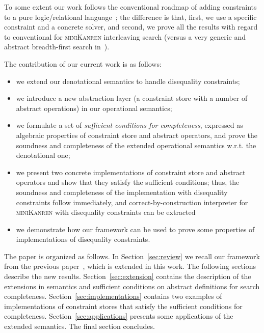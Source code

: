 To some extent our work follows the conventional roadmap of adding constraints to a pure logic/relational language~\cite{CLP}; the difference is that, first,
we use a specific constraint and a concrete solver, and second, we prove all the results with regard to conventional for \textsc{miniKanren} interleaving
search (versus a very generic and abstract breadth-first search in~\cite{CLP}).

The contribution of our current work is as follows:

\begin{itemize}
\item we extend our denotational semantics to handle disequality constraints;
\item we introduce a new abstraction layer (a constraint store with a number of abstract operations) in our operational semantics;
\item we formulate a set of \emph{sufficient conditions for completeness}, expressed as algebraic properties of constraint store and
  abstract operators, and prove the soundness and completeness of the extended operational semantics w.r.t. the denotational one;
\item we present two concrete implementations of constraint store and abstract operators and show that they satisfy the
  sufficient conditions; thus, the soundness and completeness of the implementation with disequality constraints follow
  immediately, and correct-by-construction interpreter for \textsc{miniKanren} with disequality constraints
  can be extracted
\item we demonstrate how our framework can be used to prove some properties of implementations of disequality constraints.
\end{itemize}

The paper is organized as follows. In Section~\ref{sec:review} we recall our framework from the previous paper~\cite{CertifiedSemantics}, which is extended in this work. The following sections describe the new results. Section~\ref{sec:extension} contains the description of the extensions in semantics and sufficient conditions on abstract definitions for search completeness. Section~\ref{sec:implementations} contains two examples of implementations of constraint stores that satisfy the sufficient conditions for completeness. Section~\ref{sec:applications} presents some applications of the extended semantics. The final section concludes.
